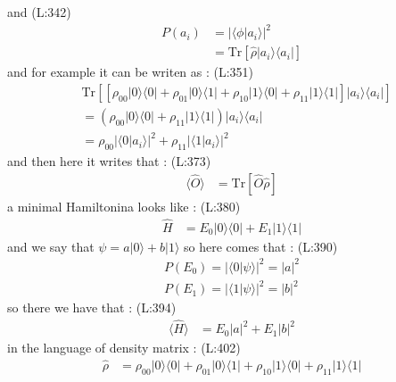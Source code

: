  and
(L:342)
\begin{equation}
\begin{split}
P (a _{i })&=|{\langle \phi |a _{i }\rangle}|^{2}\\
&=\text{Tr}\left[\hat{\rho }|a _{i }\rangle \langle a _{i }|\right]\end{split}
\end{equation}
 and for example it can be writen as : 
(L:351)
\begin{equation}
\begin{split}
&\text{Tr}\left[[\rho _{00}|0\rangle \langle 0|+\rho _{01}|0\rangle \langle 1|+\rho _{10}|1\rangle \langle 0|+\rho _{11}|1\rangle \langle 1|]|a _{i }\rangle \langle a _{i }|\right]\\
&=(\rho _{00}|0\rangle \langle 0|+\rho _{11}|1\rangle \langle 1|)|a _{i }\rangle \langle a _{i }|\\
&=\rho _{00}|{\langle 0|a _{i }\rangle}|^{2}+\rho _{11}|{\langle 1|a _{i }\rangle}|^{2}\end{split}
\end{equation}
 and then here it writes that : 
(L:373)
\begin{equation}
\begin{split}
\langle \hat{O }\rangle &=\text{Tr}\left[\hat{O }\hat{\rho }\right]\end{split}
\end{equation}
 a minimal Hamiltonina looks like : 
(L:380)
\begin{equation}
\begin{split}
\hat{H }&=E _{0}|0\rangle \langle 0|+E _{1}|1\rangle \langle 1|\end{split}
\end{equation}
 and we say that
 $ \psi =a |0\rangle +b |1\rangle  $  so here comes that : 
(L:390)
\begin{equation}
\begin{split}
P (E _{0})=|{\langle 0|\psi \rangle}|^{2}=|a |^{2}\\
P (E _{1})=|{\langle 1|\psi \rangle}|^{2}=|b |^{2}\end{split}
\end{equation}
 so there we have that : 
(L:394)
\begin{equation}
\begin{split}
\langle \hat{H }\rangle &=E _{0}|a |^{2}+E _{1}|b |^{2}\end{split}
\end{equation}
 in the language of density matrix : 
(L:402)
\begin{equation}
\begin{split}
\hat{\rho }&=\rho _{00}|0\rangle \langle 0|+\rho _{01}|0\rangle \langle 1|+\rho _{10}|1\rangle \langle 0|+\rho _{11}|1\rangle \langle 1|\end{split}
\end{equation}
